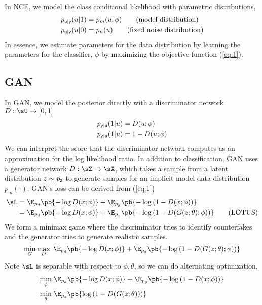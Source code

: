 \documentclass[11pt]{article}
\begin{document}
In NCE, we model the class conditional likelihood with parametric distributions,
\begin{align*}
    p_{\mathsf{u}|\mathsf{y}}(u|1)
        &= p_m(u; \phi) \tag{model distribution} \\
    p_{\mathsf{u}|\mathsf{y}}(u|0)
        &= p_n(u) \tag{fixed noise distribution}
\end{align*}
In essence, we estimate parameters for the data distribution by learning the parameters for the classifier, $\phi$ by maximizing the objective function (\ref{eq:1}).


\subsection{GAN}

In GAN, we model the posterior directly with a discriminator network $D:\sU\to[0,1]$
\begin{align*}
    p_{\mathsf{y}|\mathsf{u}}(1|u)
        &= D(u; \phi) \\
    p_{\mathsf{y}|\mathsf{u}}(1|u)
        &= 1-D(u; \phi)
\end{align*}
We can interpret the score that the discriminator network computes as an approximation for the log likelihood ratio. In addition to classification, GAN uses a generator network $D:\sZ\to\sX$, which takes a sample from a latent distribution $z\sim p_{\mathsf{z}}$ to generate samples for an implicit model data distribution $p_m(\cdot)$. GAN's loss can be derived from (\ref{eq:1})
\begin{align*}
    \sL
        &=  \E_{p_d}\pb{ -\log D(x;\phi) } +  \E_{p_g}\pb{ -\log \left( 1- D(x;\phi) \right) } \\
        &=  \E_{p_d}\pb{ -\log D(x;\phi) } +  \E_{p_z}\pb{ -\log \left( 1- D(G(z;\theta);\phi) \right) } \tag{LOTUS}
\end{align*}
We form a minimax game where the discriminator tries to identify counterfakes and the generator tries to generate realistic samples. 
\[
    \min_{G} \max_{D} \;  \E_{p_d}\pb{ -\log D(x;\phi) } +  \E_{p_z}\pb{ -\log \left( 1- D(G(z;\theta);\phi) \right) }    
\]
Note $\sL$ is separable with respect to $\phi,\theta$, so we can do alternating optimization, 
\begin{align}
    \label{eq:alternating_loss}
    \min_{\phi} \;
        &\E_{p_d}\pb{ -\log D(x;\phi) } + \E_{p_g}\pb{ -\log \left( 1- D(x;\phi) \right) }  \notag \\
    \min_{\theta} \;
        &\E_{p_z}\pb{ \log \left( 1- D(G(z;\theta)) \right) }
\end{align}










\printbibliography 
\end{document}
